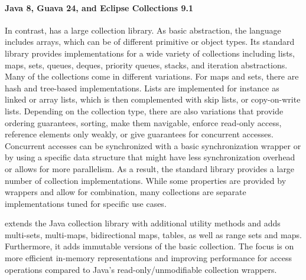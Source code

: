 \documentclass[sigconf, 10pt]{acmart}
\begin{document}
\paragraph{Java 8, Guava 24, and Eclipse Collections 9.1}


In contrast, 
has a large collection library.
As basic abstraction, the language includes arrays,
which can be of different primitive or object types.
Its standard library provides implementations for a wide variety of collections
including lists, maps, sets, queues, deques, priority queues, stacks,
and iteration abstractions.
Many of the collections come in different variations.
For maps and sets, there are hash and tree-based implementations.
Lists are implemented for instance as linked or array lists,
which is then complemented with skip lists, or copy-on-write lists.
Depending on the collection type,
there are also variations that
provide ordering guarantees, sorting, make them navigable,
enforce read-only access, reference elements only weakly,
or give guarantees for concurrent accesses.
Concurrent accesses can be synchronized
with a basic synchronization wrapper
or by using a specific data structure
that might have less synchronization overhead
or allows for more parallelism.
%
As a result,
the standard library provides a large number of collection implementations.
While some properties are provided by wrappers
and allow for combination,
many collections are separate implementations tuned for specific use cases.


extends the Java collection library with additional utility methods
and adds
multi-sets, multi-maps,  bidirectional maps, tables, as well as range sets and maps.
Furthermore, it adds immutable versions of the basic collection.
The focus is on more efficient in-memory representations
and improving performance for access operations
compared to Java's read-only/unmodifiable collection wrappers.
\end{document}
